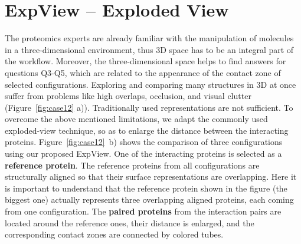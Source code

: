 \documentclass{bmcart}
\begin{document}
\section{ExpView -- Exploded View}
The proteomics experts are already familiar with the manipulation of molecules in a three-dimensional environment, thus 3D space has to be an integral part of the workflow.
Moreover, the three-dimensional space helps to find answers for questions Q3-Q5, which are related to the appearance of the contact zone of selected configurations.
Exploring and comparing many structures in 3D at once suffer from problems like high overlaps, occlusion, and visual clutter (Figure~\ref{fig:case12} a)). 
Traditionally used representations are not sufficient.
To overcome the above mentioned limitations, we adapt the commonly used exploded-view technique, so as to enlarge the distance between the interacting proteins. 
Figure~\ref{fig:case12}~b) shows the comparison of three configurations using our proposed ExpView.
One of the interacting proteins is selected as a \textbf{reference protein}.
The reference proteins from all configurations are structurally aligned so that their surface representations are overlapping. 
Here it is important to understand that the reference protein shown in the figure (the biggest one) actually represents three overlapping aligned proteins, each coming from one configuration.
The \textbf{paired proteins} from the interaction pairs are located around the reference ones, their distance is enlarged, and the corresponding contact zones are connected by colored tubes. 

\end{document}
